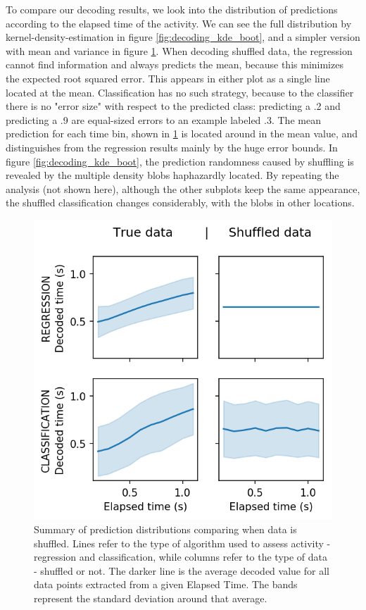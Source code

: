 To compare our decoding results, we look into the distribution of predictions according to the elapsed time of the activity. We can see the full distribution by kernel-density-estimation in figure \ref{fig:decoding_kde_boot}, and a simpler version with mean and variance in figure \ref{fig:decoding_line_boot}. When decoding shuffled data, the regression cannot find information and always predicts the mean, because this minimizes the expected root squared error. This appears in either plot as a single line located at the mean. Classification has no such strategy, because to the classifier there is no "error size" with respect to the predicted class: predicting a .2 and predicting a .9 are equal-sized errors to an example labeled .3. The mean prediction for each time bin, shown in \ref{fig:decoding_line_boot} is located around in the mean value, and distinguishes from the regression results mainly by the huge error bounds. In figure \ref{fig:decoding_kde_boot}, the prediction randomness caused by shuffling is revealed by the multiple density blobs haphazardly located. By repeating the analysis (not shown here), although the other subplots keep the same appearance, the shuffled classification changes considerably, with the blobs in other locations.

\begin{figure}[ht]
    \centering
    \includegraphics{figures/decoding_line_bootstrap_vs_true_31.png}
    \caption[Summary of prediction distributions comparing when data is shuffled]{Summary of prediction distributions comparing when data is shuffled. Lines refer to the type of algorithm used to assess activity - regression and classification, while columns refer to the type of data - shuffled or not. The darker line is the average decoded value for all data points extracted from a given Elapsed Time. The bands represent the standard deviation around that average.}
    \label{fig:decoding_line_boot}
\end{figure}

